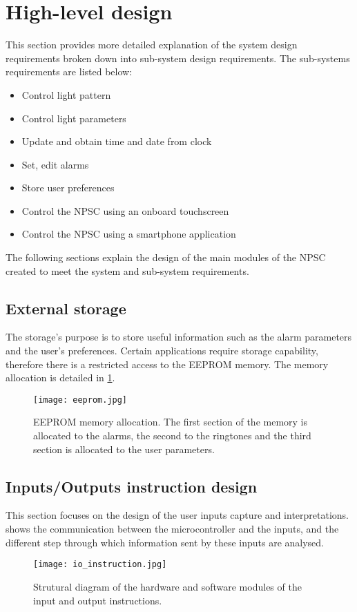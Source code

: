 \section{High-level design}
This section provides more detailed explanation of the system design requirements broken down into sub-system design requirements. The sub-systems requirements are listed below:
\begin{itemize}
\item Control light pattern
\item Control light parameters
\item Update and obtain time and date from clock
\item Set, edit alarms
\item Store user preferences
\item Control the NPSC using an onboard touchscreen
\item Control the NPSC using a smartphone application
\end{itemize}
The following sections explain the design of the main modules of the NPSC created to meet the system and sub-system requirements.


\subsection{External storage}
The storage's purpose is to store useful information such as the alarm parameters and the user's preferences. Certain applications require storage capability, therefore there is a restricted access to the EEPROM memory. The memory allocation is detailed in \cref{fig:eeprom}.
\begin{figure}[ht]
\centering
\texttt{[image: eeprom.jpg]}
\caption{EEPROM memory allocation. The first section of the memory is allocated to the alarms, the second to the ringtones and the third section is allocated to the user parameters.}
\label{fig:eeprom}
\end{figure}

\subsection{Inputs/Outputs instruction design}
This section focuses on the design of the user inputs capture and interpretations.  shows the communication between the microcontroller and the inputs, and the different step through which information sent by these inputs are analysed. 
\begin{figure}[ht]
\centering
\texttt{[image: io\_instruction.jpg]}
\caption{Strutural diagram of the hardware and software modules of the input and output instructions.}
\label{fig:io_instruction}
\end{figure}

